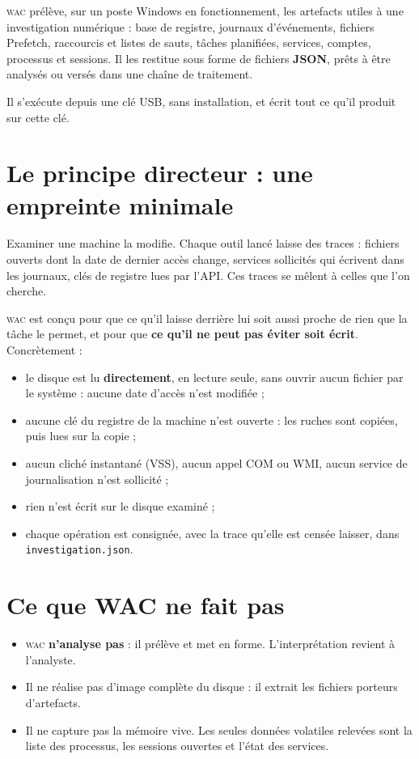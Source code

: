 \documentclass[11pt,a4paper,oneside]{report}
\newcommand{\wac}{\textsc{wac}}
\newcommand{\fichier}[1]{\texttt{#1}}
\begin{document}
\wac{} prélève, sur un poste Windows en fonctionnement, les artefacts utiles à
une investigation numérique : base de registre, journaux d'événements, fichiers
Prefetch, raccourcis et listes de sauts, tâches planifiées, services, comptes,
processus et sessions. Il les restitue sous forme de fichiers \textbf{JSON},
prêts à être analysés ou versés dans une chaîne de traitement.

Il s'exécute depuis une clé USB, sans installation, et écrit tout ce qu'il
produit sur cette clé.

\section{Le principe directeur : une empreinte minimale}

Examiner une machine la modifie. Chaque outil lancé laisse des traces : fichiers
ouverts dont la date de dernier accès change, services sollicités qui écrivent
dans les journaux, clés de registre lues par l'API. Ces traces se mêlent à celles
que l'on cherche.

\wac{} est conçu pour que ce qu'il laisse derrière lui soit aussi proche de rien
que la tâche le permet, et pour que \textbf{ce qu'il ne peut pas éviter soit
écrit}. Concrètement :

\begin{itemize}
  \item le disque est lu \textbf{directement}, en lecture seule, sans ouvrir aucun
        fichier par le système : aucune date d'accès n'est modifiée ;
  \item aucune clé du registre de la machine n'est ouverte : les ruches sont
        copiées, puis lues sur la copie ;
  \item aucun cliché instantané (VSS), aucun appel COM ou WMI, aucun service de
        journalisation n'est sollicité ;
  \item rien n'est écrit sur le disque examiné ;
  \item chaque opération est consignée, avec la trace qu'elle est censée laisser,
        dans \fichier{investigation.json}.
\end{itemize}

\section{Ce que WAC ne fait pas}

\begin{itemize}
  \item \wac{} \textbf{n'analyse pas} : il prélève et met en forme. L'interprétation
        revient à l'analyste.
  \item Il ne réalise pas d'image complète du disque : il extrait les fichiers
        porteurs d'artefacts.
  \item Il ne capture pas la mémoire vive. Les seules données volatiles relevées
        sont la liste des processus, les sessions ouvertes et l'état des
        services.
\end{itemize}
\end{document}
